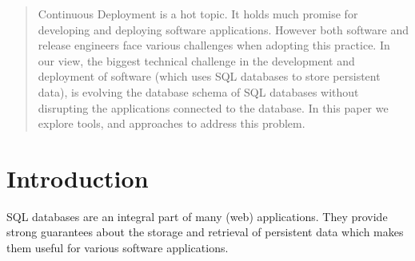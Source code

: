 \documentclass[conference]{IEEEtran}
\begin{document}
\maketitle


\begin{abstract}

Continuous Deployment is a hot topic. It holds much promise for developing and deploying software applications. However both software and release engineers face various challenges when adopting this practice. In our view, the biggest technical challenge in the development and deployment of software (which uses SQL databases to store persistent data), is evolving the database schema of SQL databases without disrupting the applications connected to the database. In this paper we explore tools, and approaches to address this problem.

\end{abstract}





%
\IEEEpeerreviewmaketitle



\section{Introduction} %


SQL databases are an integral part of many (web) applications. They provide strong guarantees about the storage and retrieval of persistent data which makes them useful for various software applications. 
\end{document}
